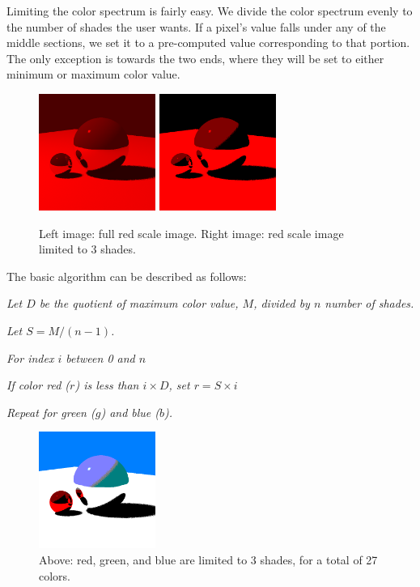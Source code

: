\documentclass{acmsiggraph}
\begin{document}
Limiting the color spectrum is fairly easy.  We divide the color spectrum
evenly to the number of shades the user wants.  If a pixel's value falls under
any of the middle sections, we set it to a pre-computed value corresponding to
that portion.  The only exception is towards the two ends, where they will be
set to either minimum or maximum color value.
\begin{figure}[htp]
\centering
\includegraphics[width=1.5in]{red_scale}
\includegraphics[width=1.5in]{red_shades}
\caption{Left image: full red scale image. Right image: red scale image limited to 3 shades.}
\label{red_limiting_color}
\end{figure}

The basic algorithm can be described as follows:

\textit{Let $D$ be the quotient of maximum color value, $M$, divided by $n$
number of shades.}

\textit{Let $S = M / (n - 1)$.}

\textit{For index $i$ between 0 and $n$}

\hspace{10 mm} \textit{If color red ($r$) is less than $i \times D$, set $r = S
\times i$ }

\textit{Repeat for green ($g$) and blue ($b$).}

\begin{figure}[htp]
\centering
\includegraphics[width=1.5in]{color_shades}
\caption{Above: red, green, and blue are limited to 3 shades, for a total of 27 colors.}
\label{limiting_color}
\end{figure}
\end{document}
